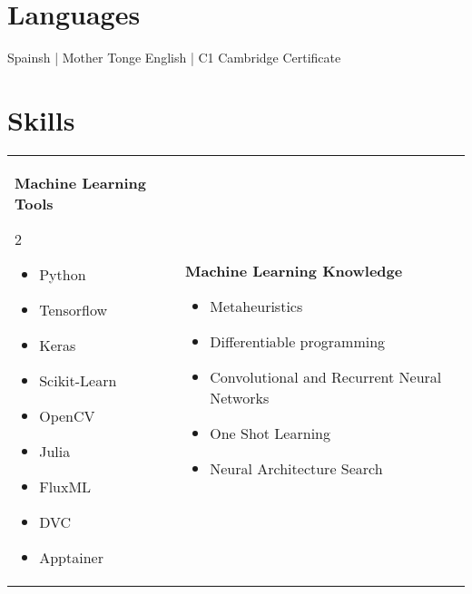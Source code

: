 \documentclass[12pt, letterpaper]{article}
\renewcommand{\large}{\fontsize{14}{20}\selectfont}
\begin{document}
	\section{Languages}
	\textcolor{accent-color}{Spainsh |} Mother Tonge \hspace{2.5em}
	\textcolor{accent-color}{English |} C1 Cambridge Certificate

	\section{Skills}
	\begin{tabular}[t]{ l l }
		\parbox[l]{0.5\linewidth}{
			{\large \color{base-color} \textbf{Machine Learning Tools}}
			\begin{multicols}{2}
			\begin{itemize}[leftmargin=*]
				\setlength\itemsep{0.05em}
				\item[] Python
				\item[] Tensorflow
				\item[] Keras
				\item[] Scikit-Learn
				\item[] OpenCV
				\item[] Julia
				\item[] FluxML
				\item[] DVC
				\item[] Apptainer
			\end{itemize}
			\end{multicols}
		}&
		\parbox{0.5\textwidth}{
			{\large \color{base-color} \textbf{Machine Learning Knowledge}}
			\begin{itemize}[leftmargin=*]
				\setlength\itemsep{0.05em}
				\item[] Metaheuristics
				\item[] Differentiable programming
				\item[] Convolutional and Recurrent Neural Networks
				\item[] One Shot Learning
				\item[] Neural Architecture Search
			\end{itemize}
		}\medskip \\


\end{tabular}
\end{document}
